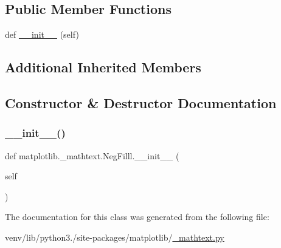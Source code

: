 \subsection*{Public Member Functions}
\begin{DoxyCompactItemize}
\item 
def \hyperlink{classmatplotlib_1_1__mathtext_1_1NegFilll_ad2a287fa47acbf9cb4854a84a0875050}{\+\_\+\+\_\+init\+\_\+\+\_\+} (self)
\end{DoxyCompactItemize}
\subsection*{Additional Inherited Members}


\subsection{Constructor \& Destructor Documentation}
\mbox{\label{classmatplotlib_1_1__mathtext_1_1NegFilll_ad2a287fa47acbf9cb4854a84a0875050}} 
\subsubsection{\texorpdfstring{\+\_\+\+\_\+init\+\_\+\+\_\+()}{\_\_init\_\_()}}
{\footnotesize\ttfamily def matplotlib.\+\_\+mathtext.\+Neg\+Filll.\+\_\+\+\_\+init\+\_\+\+\_\+ (\begin{DoxyParamCaption}\item[{}]{self }\end{DoxyParamCaption})}



The documentation for this class was generated from the following file\+:\begin{DoxyCompactItemize}
\item 
venv/lib/python3./site-\/packages/matplotlib/\hyperlink{__mathtext_8py}{\+\_\+mathtext.\+py}\end{DoxyCompactItemize}
